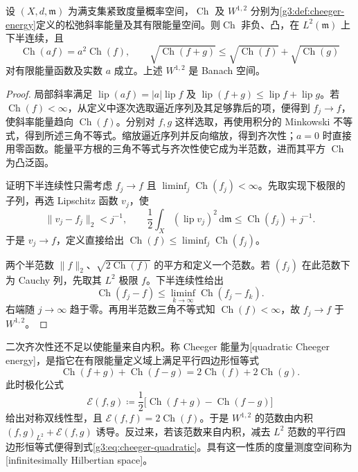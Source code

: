 \begin{proposition}\label{g3:prop:cheeger-basic-properties}
	设 \((X,d,\mathfrak m)\) 为满支集紧致度量概率空间，\(\operatorname{Ch}\) 及 \(W^{1,2}\) 分别为\cref{g3:def:cheeger-energy}定义的松弛斜率能量及其有限能量空间。则\(\operatorname{Ch}\) 非负、凸，在 \(L^2(\mathfrak m)\) 上下半连续，且
	\[
		\operatorname{Ch}(af)=a^2\operatorname{Ch}(f),\qquad
		\sqrt{\operatorname{Ch}(f+g)}
		\le\sqrt{\operatorname{Ch}(f)}+\sqrt{\operatorname{Ch}(g)}
	\]
	对有限能量函数及实数 \(a\) 成立。上述 \(W^{1,2}\) 是 Banach 空间。
\end{proposition}
\begin{proof}
	局部斜率满足 \(\operatorname{lip}(af)=|a|\operatorname{lip}f\) 及
	\(\operatorname{lip}(f+g)\le\operatorname{lip}f+\operatorname{lip}g\)。若 \(\operatorname{Ch}(f)<\infty\)，从定义中逐次选取逼近序列及其足够靠后的项，便得到 \(f_j\to f\)，使斜率能量趋向 \(\operatorname{Ch}(f)\)。分别对 \(f,g\) 这样选取，再使用积分的 Minkowski 不等式，得到所述三角不等式。缩放逼近序列并反向缩放，得到齐次性；\(a=0\) 时直接用零函数。能量平方根的三角不等式与齐次性使它成为半范数，进而其平方 \(\operatorname{Ch}\) 为凸泛函。

	证明下半连续性只需考虑 \(f_j\to f\) 且 \(\liminf_j\operatorname{Ch}(f_j)<\infty\)。先取实现下极限的子列，再选 Lipschitz 函数 \(v_j\)，使
	\[
		\|v_j-f_j\|_2<j^{-1},\qquad
		\frac12\int_X(\operatorname{lip}v_j)^2\,\mathrm d\mathfrak m
		\le\operatorname{Ch}(f_j)+j^{-1}.
	\]
	于是 \(v_j\to f\)，定义直接给出 \(\operatorname{Ch}(f)\le\liminf_j\operatorname{Ch}(f_j)\)。

	两个半范数 \(\|f\|_2\)、\(\sqrt{2\operatorname{Ch}(f)}\) 的平方和定义一个范数。若 \((f_j)\) 在此范数下为 Cauchy 列，先取其 \(L^2\) 极限 \(f\)。下半连续性给出
	\[
		\operatorname{Ch}(f_j-f)
		\le\liminf_{k\to\infty}\operatorname{Ch}(f_j-f_k).
	\]
	右端随 \(j\to\infty\) 趋于零。再用半范数三角不等式知 \(\operatorname{Ch}(f)<\infty\)，故 \(f_j\to f\) 于 \(W^{1,2}\)。
\end{proof}

二次齐次性还不足以使能量来自内积。称 Cheeger 能量为[quadratic Cheeger energy]，是指它在有限能量定义域上满足平行四边形恒等式
\begin{equation}\label{g3:eq:cheeger-quadratic}
	\operatorname{Ch}(f+g)+\operatorname{Ch}(f-g)
	=2\operatorname{Ch}(f)+2\operatorname{Ch}(g).
\end{equation}
此时极化公式
\begin{equation}\label{g3:eq:cheeger-polarization}
	\mathcal E(f,g)\coloneqq
	\frac12\bigl[\operatorname{Ch}(f+g)-\operatorname{Ch}(f-g)\bigr]
\end{equation}
给出对称双线性型，且 \(\mathcal E(f,f)=2\operatorname{Ch}(f)\)。于是 \(W^{1,2}\) 的范数由内积 \((f,g)_{L^2}+\mathcal E(f,g)\) 诱导。反过来，若该范数来自内积，减去 \(L^2\) 范数的平行四边形恒等式便得到式\eqref{g3:eq:cheeger-quadratic}。具有这一性质的度量测度空间称为[infinitesimally Hilbertian space]。

